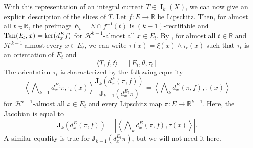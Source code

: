 \documentclass{amsart}
\numberwithin{equation}{section}
\newcommand{\R}{\mathbb{R}}
\newcommand{\Ha}{\mathcal{H}}
\DeclareMathOperator{\bI}{\mathbf{I}}
\begin{document}
\medskip

        With this representation of an integral current $T\in  \bI_k(X)$, we can now give an explicit description of the slices of $T$. Let $f\colon E \to \R$ be Lipschitz. Then, for almost all $t\in \R$, the preimage $E_t = E\cap f^{-1}(t)$ is $(k-1)$-rectifiable and $\textup{Tan}(E_t,x) = \ker(d_x^Ef)$ for $\Ha^{k-1}$-almost all $x \in E_t$. By \cite[Theorem 9.1]{ambrosio-kirchheim-2000}, for almost all $t\in \R$ and $\Ha^{k-1}$-almost every $x \in E_t$, we can write $\tau(x) = \xi(x)\wedge \tau_t(x)$ such that $\tau_t$ is an orientation of $E_t$ and 
        \begin{equation}\label{eq: repres-slice}
            \langle T, f,t \rangle = [ E_t, \theta, \tau_t]
        \end{equation}
        The orientation  $\tau_t$ is characterized by the following equality
        \begin{equation}\label{eq: slice-represent-1}
            \left\langle \bigwedge\nolimits_{k-1} d_x^{E_t}  \pi, \tau_t(x) \right\rangle \frac{\mathbf{J}_k(d_x^E(\pi,f))}{\mathbf{J}_{k-1}(d_x^{E_t}\pi)} = \left\langle \bigwedge\nolimits_{k} d^E_x( \pi,f), \tau(x)\right\rangle 
        \end{equation}
        for $\Ha^{k-1}$-almost all $x\in E_t$ and every Lipschitz map $\pi\colon E \to \R^{k-1}$. Here, the Jacobian is equal to 
        $$\mathbf{J}_k(d_x^E(\pi,f))= \left|\left\langle \bigwedge\nolimits_{k} d^E_x( \pi,f), \tau(x)\right\rangle \right|.$$
        A similar equality is true for $\mathbf{J}_{k-1}(d_x^{E_t}\pi)$, but we will not need it here.
        
        \medskip
        
\end{document}
